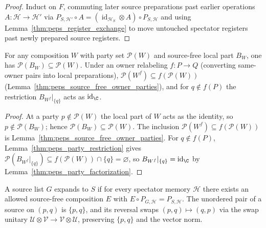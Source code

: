 \begin{proof}\leanok
    Induct on $F$, commuting later source preparations past earlier operations $A:\mathcal H\to\mathcal H'$ via $P_{S,\mathcal H'}\circ A=(\operatorname{id}_{\mathcal H_S}\otimes A)\circ P_{S,\mathcal H}$ and using Lemma~\ref{thm:peps_register_exchange} to move untouched spectator registers past newly prepared source registers.
\end{proof}

\begin{lemma}
    \label{thm:peps_source_word_parties}
    \leanok
    For any composition $W$ with party set $\mathcal P(W)$ and source-free local part $B_W$, one has $\mathcal P(B_W)\subseteq\mathcal P(W)$. Under an owner relabeling $f:P\to Q$ (converting same-owner pairs into local preparations), $\mathcal P(W^f)\subseteq f(\mathcal P(W))$ (Lemma~\ref{thm:peps_source_free_owner_parties}), and for $q\notin f(P)$ the restriction $B_{W^f}|_{\{q\}}$ acts as $\operatorname{id}_{\C}$.
\end{lemma}

\begin{proof}\leanok
    At a party $p\notin\mathcal P(W)$ the local part of $W$ acts as the identity, so $p\notin\mathcal P(B_W)$; hence $\mathcal P(B_W)\subseteq\mathcal P(W)$. The inclusion $\mathcal P(W^f)\subseteq f(\mathcal P(W))$ is Lemma~\ref{thm:peps_source_free_owner_parties}. For $q\notin f(P)$, Lemma~\ref{thm:peps_party_restriction} gives $\mathcal P(B_{W^f}|_{\{q\}})\subseteq f(\mathcal P(W))\cap\{q\}=\varnothing$, so $B_{W^f}|_{\{q\}}=\operatorname{id}_{\C}$ by Lemma~\ref{thm:peps_party_factorization}.
\end{proof}

\begin{definition}
    \label{def:peps_source_expansion}
    \leanok
    A source list $G$ expands to $S$ if for every spectator memory $\mathcal H$ there exists an allowed source-free composition $E$ with $E\circ P_{G,\mathcal H}=P_{S,\mathcal H}$. The unordered pair of a source on $(p,q)$ is $\{p,q\}$, and its reversal swaps $(p,q)\mapsto(q,p)$ via the swap unitary $\mathcal U\otimes\mathcal V\to\mathcal V\otimes\mathcal U$, preserving $\{p,q\}$ and the vector norm.
\end{definition}

